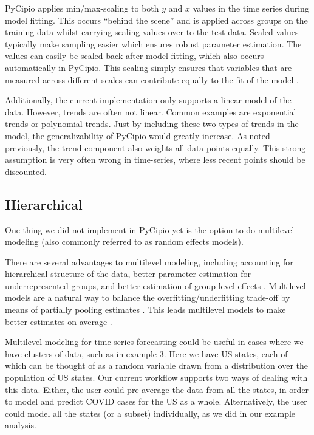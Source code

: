\documentclass{article}
\begin{document}
PyCipio applies min/max-scaling to both $y$ and $x$ values in the time series during model fitting. This occurs “behind the scene” and is applied across groups on the training data whilst carrying scaling values over to the test data. Scaled values typically make sampling easier which ensures robust parameter estimation. The values can easily be scaled back after model fitting, which also occurs automatically in PyCipio. This scaling simply ensures that variables that are measured across different scales can contribute equally to the fit of the model \cite{Min-Max}. 

Additionally, the current implementation only supports a linear model of the data. However, trends are often not linear. Common examples are exponential trends or polynomial trends. Just by including these two types of trends in the model, the generalizability of PyCipio would greatly increase. As noted previously, the trend component also weights all data points equally. This strong assumption is very often wrong in time-series, where less recent points should be discounted. 

\subsection{Hierarchical}

One thing we did not implement in PyCipio yet is the option to do multilevel modeling (also commonly referred to as random effects models).

There are several advantages to multilevel modeling, including accounting for hierarchical structure of the data, better parameter estimation for underrepresented groups, and better estimation of group-level effects \cite{Fonnesbeck}. Multilevel models are a natural way to balance the overfitting/underfitting trade-off by means of partially pooling estimates \cite[p.~14]{McElreath}. This leads multilevel models to make better estimates on average \cite[p.~414]{McElreath}.

Multilevel modeling for time-series forecasting could be useful in cases where we have clusters of data, such as in example 3. Here we have US states, each of which can be thought of as a random variable drawn from a distribution over the population of US states. Our current workflow supports two ways of dealing with this data. Either, the user could pre-average the data from all the states, in order to model and predict COVID cases for the US as a whole. Alternatively, the user could model all the states (or a subset) individually, as we did in our example analysis.
\end{document}
